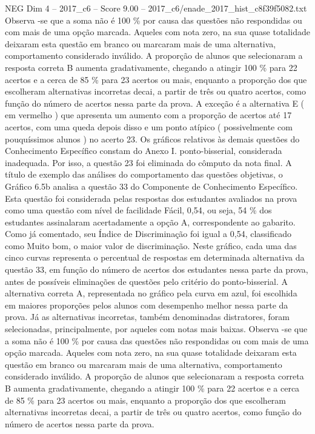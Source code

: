 \begin{textsample}{NEG Dim 4 – 2017\_c6 – Score 9.00 – 2017\_c6/enade\_2017\_hist\_c8f39f5082.txt}
Observa -se que a soma não é 100 \% por causa das questões não respondidas ou com mais de uma opção marcada.
Aqueles com nota zero, na sua quase totalidade deixaram esta questão em branco ou marcaram mais de uma alternativa, comportamento considerado inválido.
A proporção de alunos que selecionaram a resposta correta B aumenta gradativamente, chegando a atingir 100 \% para 22 acertos e a cerca de 85 \% para 23 acertos ou mais, enquanto a proporção dos que escolheram alternativas incorretas decai, a partir de três ou quatro acertos, como função do número de acertos nessa parte da prova.
A exceção é a alternativa E ( em vermelho ) que apresenta um aumento com a proporção de acertos até 17 acertos, com uma queda depois disso e um ponto atípico ( possivelmente com pouquíssimos alunos ) no acerto 23.
Os gráficos relativos às demais questões do Conhecimento Específico constam do Anexo I. ponto-bisserial, considerada inadequada.
Por isso, a questão 23 foi eliminada do cômputo da nota final.
A título de exemplo das análises do comportamento das questões objetivas, o Gráfico 6.5b analisa a questão 33 do Componente de Conhecimento Específico.
Esta questão foi considerada pelas respostas dos estudantes avaliados na prova como uma questão com nível de facilidade Fácil, 0,54, ou seja, 54 \% dos estudantes assinalaram acertadamente a opção A, correspondente ao gabarito.
Como já comentado, seu Índice de Discriminação foi igual a 0,54, classificado como Muito bom, o maior valor de discriminação.
Neste gráfico, cada uma das cinco curvas representa o percentual de respostas em determinada alternativa da questão 33, em função do número de acertos dos estudantes nessa parte da prova, antes de possíveis eliminações de questões pelo critério do ponto-bisserial.
A alternativa correta A, representada no gráfico pela curva em azul, foi escolhida em maiores proporções pelos alunos com desempenho melhor nessa parte da prova.
Já as alternativas incorretas, também denominadas distratores, foram selecionadas, principalmente, por aqueles com notas mais baixas.
Observa -se que a soma não é 100 \% por causa das questões não respondidas ou com mais de uma opção marcada.
Aqueles com nota zero, na sua quase totalidade deixaram esta questão em branco ou marcaram mais de uma alternativa, comportamento considerado inválido.
A proporção de alunos que selecionaram a resposta correta B aumenta gradativamente, chegando a atingir 100 \% para 22 acertos e a cerca de 85 \% para 23 acertos ou mais, enquanto a proporção dos que escolheram alternativas incorretas decai, a partir de três ou quatro acertos, como função do número de acertos nessa parte da prova.

\end{textsample}
